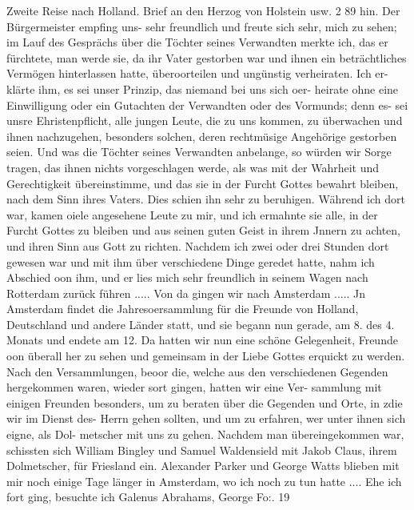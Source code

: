 Zweite Reise nach Holland. Brief an den Herzog von Holstein usw. 2 89
hin. Der Bürgermeister empfing uns- sehr freundlich und freute
sich sehr, mich zu sehen; im Lauf des Gesprächs über die Töchter
seines Verwandten merkte ich, das er fürchtete, man werde sie,
da ihr Vater gestorben war und ihnen ein beträchtliches Vermögen
hinterlassen hatte, überoorteilen und ungünstig verheiraten. Ich er-
klärte ihm, es sei unser Prinzip, das niemand bei uns sich oer-
heirate ohne eine Einwilligung oder ein Gutachten der Verwandten
oder des Vormunds; denn es- sei unsre Ehristenpflicht, alle jungen
Leute, die zu uns kommen, zu überwachen und ihnen nachzugehen,
besonders solchen, deren rechtmüsige Angehörige gestorben seien.
Und was die Töchter seines Verwandten anbelange, so würden
wir Sorge tragen, das ihnen nichts vorgeschlagen werde, als was
mit der Wahrheit und Gerechtigkeit übereinstimme, und das sie
in der Furcht Gottes bewahrt bleiben, nach dem Sinn ihres
Vaters. Dies schien ihn sehr zu beruhigen. Während ich dort
war, kamen oiele angesehene Leute zu mir, und ich ermahnte sie
alle, in der Furcht Gottes zu bleiben und aus seinen guten Geist
in ihrem Jnnern zu achten, und ihren Sinn aus Gott zu richten.
Nachdem ich zwei oder drei Stunden dort gewesen war und mit
ihm über verschiedene Dinge geredet hatte, nahm ich Abschied oon
ihm, und er lies mich sehr freundlich in seinem Wagen nach
Rotterdam zurück führen .....
Von da gingen wir nach Amsterdam ..... Jn Amsterdam
findet die Jahresoersammlung für die Freunde von Holland,
Deutschland und andere Länder statt, und sie begann nun gerade,
am 8. des 4. Monats und endete am 12. Da hatten wir nun
eine schöne Gelegenheit, Freunde oon überall her zu sehen und
gemeinsam in der Liebe Gottes erquickt zu werden. Nach den
Versammlungen, beoor die, welche aus den verschiedenen Gegenden
hergekommen waren, wieder sort gingen, hatten wir eine Ver-
sammlung mit einigen Freunden besonders, um zu beraten über
die Gegenden und Orte, in zdie wir im Dienst des- Herrn gehen
sollten, und um zu erfahren, wer unter ihnen sich eigne, als Dol-
metscher mit uns zu gehen. Nachdem man übereingekommen war,
schissten sich William Bingley und Samuel Waldensield mit Jakob
Claus, ihrem Dolmetscher, für Friesland ein.
Alexander Parker und George Watts blieben mit mir
noch einige Tage länger in Amsterdam, wo ich noch zu tun
hatte .... Ehe ich fort ging, besuchte ich Galenus Abrahams,
George Fo:. 19

